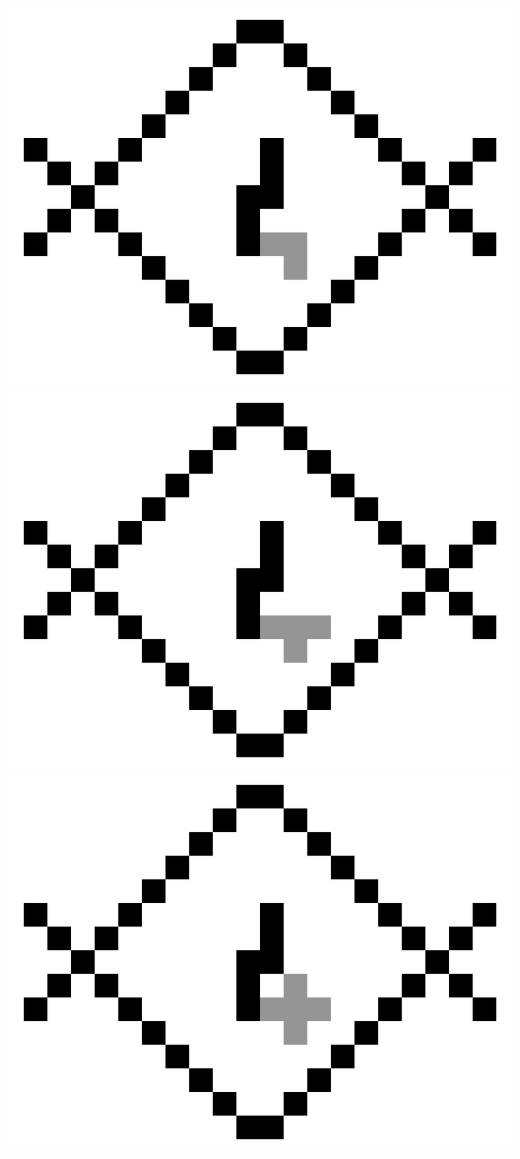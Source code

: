 \documentclass[11pt,class=report,crop=false]{standalone}
\begin{document}
\begin{center}
	\includegraphics[scale=\myscale,scale=0.15]{figures/fill01_002}\quad
    \includegraphics[scale=\myscale,scale=0.15]{figures/fill01_003}\quad
	\includegraphics[scale=\myscale,scale=0.15]{figures/fill01_004}\quad
\end{center}
\end{document}
